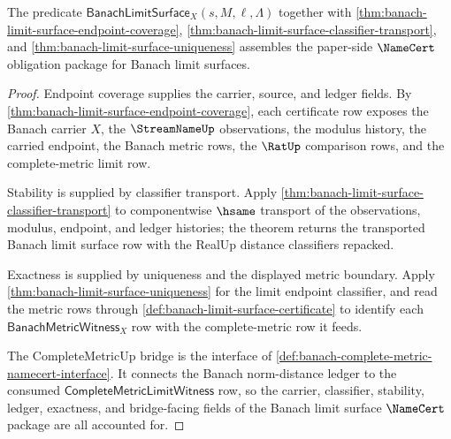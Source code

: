 \begin{theorem}
\label{thm:banach-limit-surface-namecert-obligations}
The predicate $\mathsf{BanachLimitSurface}_X(s,M,\ell,\Lambda)$ together with
\autoref{thm:banach-limit-surface-endpoint-coverage},
\autoref{thm:banach-limit-surface-classifier-transport}, and
\autoref{thm:banach-limit-surface-uniqueness} assembles the paper-side
$\NameCert$ obligation package for Banach limit surfaces.
\end{theorem}
\begin{proof}
Endpoint coverage supplies the carrier, source, and ledger fields. By
\autoref{thm:banach-limit-surface-endpoint-coverage}, each certificate row
exposes the Banach carrier $X$, the $\StreamNameUp$ observations, the modulus
history, the carried endpoint, the Banach metric rows, the $\RatUp$ comparison
rows, and the complete-metric limit row.

Stability is supplied by classifier transport. Apply
\autoref{thm:banach-limit-surface-classifier-transport} to componentwise
$\hsame$ transport of the observations, modulus, endpoint, and ledger
histories; the theorem returns the transported Banach limit surface row with
the RealUp distance classifiers repacked.

Exactness is supplied by uniqueness and the displayed metric boundary. Apply
\autoref{thm:banach-limit-surface-uniqueness} for the limit endpoint
classifier, and read the metric rows through
\autoref{def:banach-limit-surface-certificate} to identify each
$\mathsf{BanachMetricWitness}_X$ row with the complete-metric row it feeds.

The CompleteMetricUp bridge is the interface of
\autoref{def:banach-complete-metric-namecert-interface}. It connects the
Banach norm-distance ledger to the consumed
$\mathsf{CompleteMetricLimitWitness}$ row, so the carrier, classifier,
stability, ledger, exactness, and bridge-facing fields of the Banach limit
surface $\NameCert$ package are all accounted for.
\end{proof}

